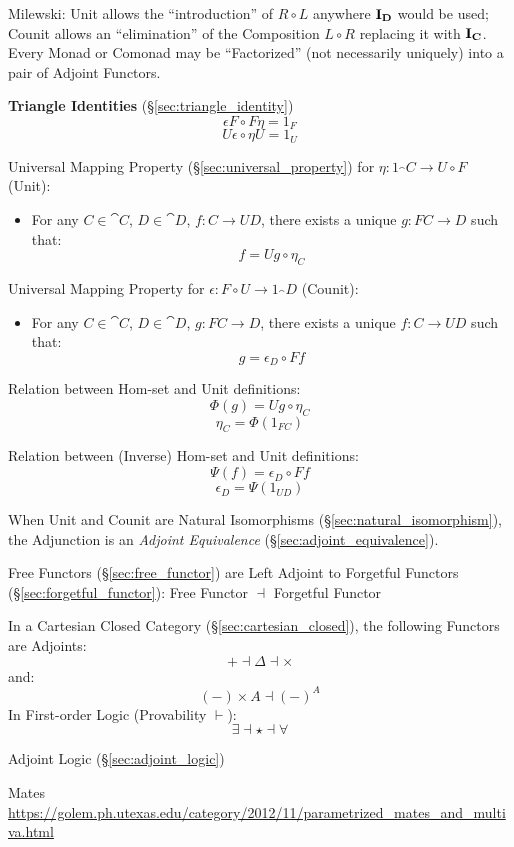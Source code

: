 Milewski: Unit allows the ``introduction'' of $R \circ L$ anywhere
$\mathbf{I}_\mathbf{D}$ would be used; Counit allows an ``elimination'' of the
Composition $L \circ R$ replacing it with $\mathbf{I}_\mathbf{C}$. Every Monad
or Comonad may be ``Factorized'' (not necessarily uniquely) into a
pair of Adjoint Functors.


\textbf{Triangle Identities} (\S\ref{sec:triangle_identity})
\[
  \epsilon F \circ F \eta = 1_F
\]\[
  U \epsilon \circ \eta U = 1_U
\]


Universal Mapping Property (\S\ref{sec:universal_property}) for $\eta
: 1_\cat{C} \rightarrow U \circ F$ (Unit):
\begin{itemize}
\item For any $C \in \cat{C}$, $D \in \cat{D}$, $f : C
  \rightarrow U D$, there exists a unique $g : FC \rightarrow D$ such
  that:
  \[
    f = U g \circ \eta_C
  \]
\end{itemize}

Universal Mapping Property for $\epsilon : F \circ U \rightarrow
1_\cat{D}$ (Counit):
\begin{itemize}
\item For any $C \in \cat{C}$, $D \in \cat{D}$, $g : F C
  \rightarrow D$, there exists a unique $f : C \rightarrow U D$ such
  that:
  \[
    g = \epsilon_D \circ F f
  \]
\end{itemize}

Relation between Hom-set and Unit definitions:
\[
  \Phi(g) = U g \circ \eta_C
\]\[
  \eta_C = \Phi(1_{FC})
\]

Relation between (Inverse) Hom-set and Unit definitions:
\[
  \Psi (f) = \epsilon_D \circ F f
\]\[
  \epsilon_D = \Psi(1_{U D})
\]

When Unit and Counit are Natural Isomorphisms
(\S\ref{sec:natural_isomorphism}), the Adjunction is an \emph{Adjoint
  Equivalence} (\S\ref{sec:adjoint_equivalence}).

Free Functors (\S\ref{sec:free_functor}) are Left Adjoint to Forgetful
Functors (\S\ref{sec:forgetful_functor}): Free Functor $\dashv$
Forgetful Functor

In a Cartesian Closed Category (\S\ref{sec:cartesian_closed}), the
following Functors are Adjoints:
\[
  + \dashv \Delta \dashv \times
\]
and:
\[
  (-) \times A \dashv (-)^A
\]
In First-order Logic (Provability $\vdash$):
\[
  \exists \dashv \star \dashv \forall
\]

Adjoint Logic (\S\ref{sec:adjoint_logic})

Mates
\url{https://golem.ph.utexas.edu/category/2012/11/parametrized_mates_and_multiva.html}

